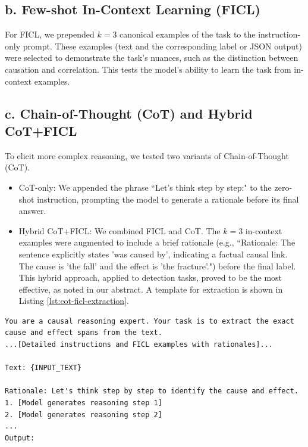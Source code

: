 \documentclass[conference]{IEEEtran}
\begin{document}
\subsection*{b. Few-shot In-Context Learning (FICL)}
For FICL, we prepended $k=3$ canonical examples of the task to the instruction-only prompt. These examples (text and the corresponding label or JSON output) were selected to demonstrate the task's nuances, such as the distinction between causation and correlation. This tests the model's ability to learn the task from in-context examples.

\subsection*{c. Chain-of-Thought (CoT) and Hybrid CoT+FICL}
To elicit more complex reasoning, we tested two variants of Chain-of-Thought (CoT).



\begin{itemize}[leftmargin=*]
    \item {CoT-only:} We appended the phrase ``Let's think step by step:" to the zero-shot instruction, prompting the model to generate a rationale before its final answer.
    \item {Hybrid CoT+FICL:} We combined FICL and CoT. The $k=3$ in-context examples were augmented to include a brief rationale (e.g., ``Rationale: The sentence explicitly states 'was caused by', indicating a factual causal link. The cause is 'the fall' and the effect is 'the fracture'.") before the final label. This hybrid approach, applied to detection tasks, proved to be the most effective, as noted in our abstract. A template for extraction is shown in Listing \ref{lst:cot-ficl-extraction}.
\end{itemize}


\begin{listing}[tb]
\begin{lstlisting}[language={}, captionpos=b, caption={Hybrid CoT+FICL prompt for Causal Extraction (2a).}, label={lst:cot-ficl-extraction}]
You are a causal reasoning expert. Your task is to extract the exact cause and effect spans from the text.
...[Detailed instructions and FICL examples with rationales]...

Text: {INPUT_TEXT}

Rationale: Let's think step by step to identify the cause and effect.
1. [Model generates reasoning step 1]
2. [Model generates reasoning step 2]
...
Output:
\end{lstlisting}
\end{listing}
\end{document}
